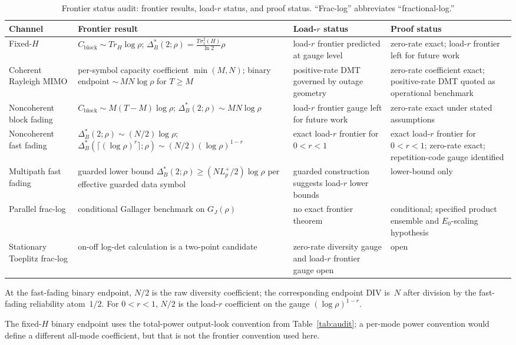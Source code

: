 \documentclass[lettersize,onecolumn]{IEEEtran}
\newcommand{\snr}{\rho}
\begin{document}
\begin{table}[ht]
\centering
\caption{Frontier status audit: frontier results, load-$r$ status,
and proof status.
``Frac-log'' abbreviates ``fractional-log.''}
\label{tab:frontier_audit}
\footnotesize
\begin{tabular}{@{}p{2.8cm}p{4.5cm}p{3.8cm}p{4.5cm}@{}}
\toprule
Channel & Frontier result
& Load-$r$ status & Proof status \\
\midrule
Fixed-$H$
& $C_{\mathrm{block}}\!\sim\! Tr_H\log\snr$;
$\Delta_B^*(2;\snr)\!=\!\frac{T\sigma_1^2(H)}{\ln 2}\snr$
& load-$r$ frontier predicted at gauge level
& zero-rate exact; load-$r$ frontier left for future work \\
Coherent Rayleigh MIMO
& per-symbol capacity coefficient $\min(M,N)$; binary endpoint
${\sim}\,MN\log\snr$ for $T\!\ge\! M$
& positive-rate DMT governed by outage geometry
& zero-rate coefficient exact; positive-rate DMT quoted as
operational benchmark \\
Noncoherent block fading
& $C_{\mathrm{block}}\!\sim\! M(T\!-\!M)\log\snr$;
$\Delta_B^*(2;\snr)\!\sim\! MN\log\snr$
& load-$r$ frontier gauge left for future work
& zero-rate exact under stated assumptions \\
Noncoherent fast fading
& $\Delta_B^*(2;\snr)\!\sim\!(N/2)\log\snr$;
$\Delta_B^*(\lceil(\log\snr)^r\rceil;\snr)\!\sim\!(N/2)(\log\snr)^{1-r}$
& exact load-$r$ frontier for
$0\!<\!r\!<\!1$
& exact load-$r$ frontier for $0<r<1$; zero-rate exact;
repetition-code gauge identified \\
Multipath fast fading
& guarded lower bound
$\Delta_B^*(2;\snr)\!\ge\!(NL_p^+/2)\log\snr$ per effective
guarded data symbol
& guarded construction suggests load-$r$ lower bounds
& lower-bound only \\
Parallel frac-log
& conditional Gallager benchmark on $G_J(\snr)$
& no exact frontier theorem
& conditional; specified product ensemble and $E_0$-scaling
hypothesis \\
Stationary Toeplitz frac-log
& on-off log-det calculation is a two-point candidate
& zero-rate diversity gauge and load-$r$ frontier gauge open
& open \\
\bottomrule
\end{tabular}

\smallskip
At the fast-fading binary endpoint, $N/2$ is the raw diversity
coefficient; the corresponding endpoint DIV is~$N$ after division by
the fast-fading reliability atom~$1/2$. For $0 < r < 1$, $N/2$ is
the load-$r$ coefficient on the gauge $(\log\snr)^{1-r}$.

The fixed-$H$ binary endpoint uses the total-power output-look
convention from Table~\ref{tab:audit}; a per-mode power convention
would define a different all-mode coefficient, but that is not the
frontier convention used here.
\end{table}
\end{document}
